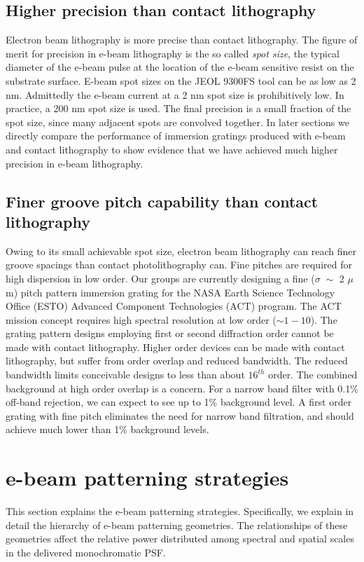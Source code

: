 \documentclass[]{spie}  %
\begin{document}
\subsection{Higher precision than contact lithography}
\label{sec:Precis}
Electron beam lithography is more precise than contact lithography.  The figure of merit for precision in e-beam lithography is the so called \emph{spot size}, the typical diameter of the e-beam pulse at the location of the e-beam sensitive resist on the substrate surface.  E-beam spot sizes on the JEOL 9300FS tool can be as low as 2 nm.  Admittedly the e-beam current at a 2 nm spot size is prohibitively low.  In practice, a 200 nm spot size is used.  The final precision is a small fraction of the spot size, since many adjacent spots are convolved together.  In later sections we directly compare the performance of immersion gratings produced with e-beam and contact lithography to show evidence that we have achieved much higher precision in e-beam lithography.  

\subsection{Finer groove pitch capability than contact lithography}
Owing to its small achievable spot size, electron beam lithography can reach finer groove spacings than contact photolithography can.  Fine pitches are required for high dispersion in low order.  Our groups are currently designing a fine ($\sigma \; \sim$ 2 $\mu$m) pitch pattern immersion grating for the NASA Earth Science Technology Office (ESTO) Advanced Component Technologies (ACT) program.  The ACT mission concept requires high spectral resolution at low order ($\sim1-10$).  The grating pattern designs employing first or second diffraction order cannot be made with contact lithography.  Higher order devices can be made with contact lithography, but suffer from order overlap and reduced bandwidth.  The reduced bandwidth limits conceivable designs to less than about $16^{th}$ order.  The combined background at high order overlap is a concern.  For a narrow band filter with 0.1\% off-band rejection, we can expect to see up to 1\% background level.  A first order grating with fine pitch eliminates the need for narrow band filtration, and should achieve much lower than 1\% background levels.  


\section{e-beam patterning strategies}
This section explains the e-beam patterning strategies.  Specifically, we explain in detail the hierarchy of e-beam patterning geometries.  The relationships of these geometries affect the relative power distributed among spectral and spatial scales in the delivered monochromatic PSF.
\end{document}
